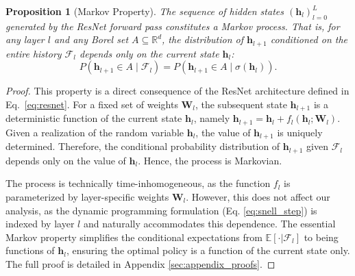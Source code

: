 \documentclass[12pt]{imsart}
\newcommand{\R}{\mathbb{R}}
\newcommand{\E}{\mathbb{E}}
\newcommand{\F}{\mathcal{F}}
\newcommand{\h}{\mathbf{h}}
\newcommand{\W}{\mathbf{W}}
\theoremstyle{plain}
\newtheorem{proposition}[theorem]{Proposition}
\theoremstyle{definition}
\begin{document}
\begin{proposition}[Markov Property]\label{prop:markov}
The sequence of hidden states $(\h_l)_{l=0}^L$ generated by the ResNet forward pass constitutes a Markov process. That is, for any layer $l$ and any Borel set $A \subseteq \R^d$, the distribution of $\h_{l+1}$ conditioned on the entire history $\F_l$ depends only on the current state $\h_l$:
\[ P(\h_{l+1} \in A \mid \F_l) = P(\h_{l+1} \in A \mid \sigma(\h_l)). \]
\end{proposition}
\begin{proof}
This property is a direct consequence of the ResNet architecture defined in Eq.~\eqref{eq:resnet}. For a fixed set of weights $\W_l$, the subsequent state $\h_{l+1}$ is a deterministic function of the current state $\h_l$, namely $\h_{l+1} = \h_l + f_l(\h_l; \W_l)$.
Given a realization of the random variable $\h_l$, the value of $\h_{l+1}$ is uniquely determined. Therefore, the conditional probability distribution of $\h_{l+1}$ given $\F_l$ depends only on the value of $\h_l$. Hence, the process is Markovian.

The process is technically time-inhomogeneous, as the function $f_l$ is parameterized by layer-specific weights $\W_l$. However, this does not affect our analysis, as the dynamic programming formulation (Eq. \ref{eq:snell_step}) is indexed by layer $l$ and naturally accommodates this dependence. The essential Markov property simplifies the conditional expectations from $\E[\cdot | \F_l]$ to being functions of $\h_l$, ensuring the optimal policy is a function of the current state only. The full proof is detailed in Appendix \ref{sec:appendix_proofs}.
\end{proof}
\end{document}
